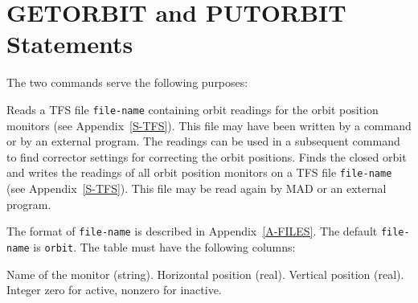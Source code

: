 \section{GETORBIT and PUTORBIT Statements}
\label{S-GETORB}
The two commands
serve the following purposes:
\begin{mylist}
Reads a TFS file {\tt file-name} containing orbit readings for the
orbit position monitors
(see Appendix~\ref{S-TFS}).
This file may have been written by a  command
or by an external program.
The readings can be used in a subsequent  command
to find corrector settings for correcting the orbit positions.
Finds the closed orbit and writes the readings of all orbit
position monitors on a TFS file {\tt file-name}
(see Appendix~\ref{S-TFS}).
This file may be read again by MAD or an external program.
\end{mylist}
The format of {\tt file-name} is described in Appendix~\ref{A-FILES}.
The default {\tt file-name} is {\tt orbit}.
The table must have the following columns:
\begin{mylist}
Name of the monitor (string).
Horizontal position (real).
Vertical position (real).
Integer zero for active, nonzero for inactive.
\end{mylist}

